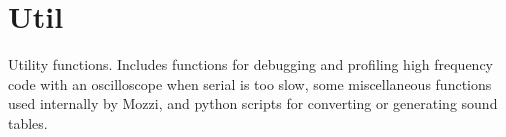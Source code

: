 \hypertarget{group__util}{}\section{Util}
\label{group__util}
Utility functions. Includes functions for debugging and profiling high frequency code with an oscilloscope when serial is too slow, some miscellaneous functions used internally by Mozzi, and python scripts for converting or generating sound tables. 